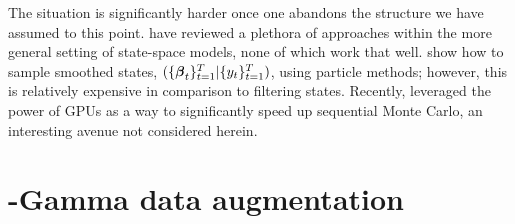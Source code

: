 \npoint The situation is significantly harder once one abandons the structure we
have assumed to this point.  \citet{geweke-tanizaki-2001} have reviewed a
plethora of approaches within the more general setting of state-space models,
none of which work that well.  \citet{godsill-etal-2004} show how to sample
smoothed states, $(\{\boldsymbol{\beta}_t\}_{t=1}^T | \{y_t\}_{t=1}^T)$, using particle
methods; however, this is relatively expensive in comparison to filtering
states.  Recently, \citet{geweke-etal-2013} leveraged the power of GPUs as a way
to significantly speed up sequential Monte Carlo, an interesting avenue not
considered herein.

\section{\Polya-Gamma data augmentation}
\label{sec:pg}

